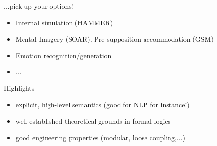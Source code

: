\documentclass[compress]{beamer}
\begin{document}
\begin{frame}{...pick up your options!}

    \begin{itemize}
        \item Internal simulation (HAMMER)
        \item Mental Imagery (SOAR), Pre-supposition accommodation (GSM)
        \item Emotion recognition/generation
        \item ...
    \end{itemize}
\end{frame}


\begin{frame}{Highlights}

    \begin{itemize}
        \item {\Medium explicit}, {\Medium high-level semantics} (good for NLP for instance!)
        \item {\Medium well-established theoretical grounds} in formal logics
        \item good engineering properties (modular, loose coupling,...)
    \end{itemize}
    


\end{frame}
\end{document}
